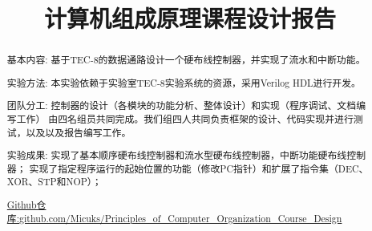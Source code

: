 \documentclass{mcmthesis}
\title{\LARGE\textbf{计算机组成原理课程设计报告}} %
\begin{document}
\begin{abstract}
  \par
  基本内容: 基于TEC-8的数据通路设计一个硬布线控制器，并实现了流水和中断功能。
  \par
  实验方法: 本实验依赖于实验室TEC-8实验系统的资源，采用Verilog HDL进行开发。
  \par
  团队分工: 控制器的设计（各模块的功能分析、整体设计）和实现（程序调试、文档编写工作）
  由四名组员共同完成。我们组四人共同负责框架的设计、代码实现并进行测试，以及以及报告编写工作。
  \par
  实验成果: 实现了基本顺序硬布线控制器和流水型硬布线控制器，中断功能硬布线控制器；
  实现了指定程序运行的起始位置的功能（修改PC指针）和扩展了指令集（DEC、XOR、STP和NOP）；
  \par
  \par
  \href{https://github.com/Micuks/Principles_of_Computer_Organization_Course_Design}
  {Github仓库:\;\url{github.com/Micuks/Principles_of_Computer_Organization_Course_Design}}
\end{abstract}
\maketitle
\tableofcontents
\pagebreak






% 
\end{document}
